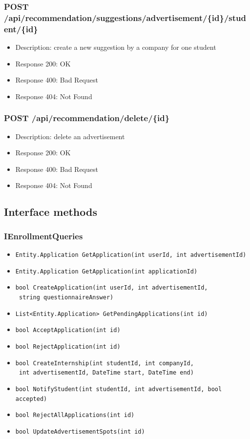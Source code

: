 \subsubsection{POST /api/recommendation/suggestions/advertisement/\{id\}/student/\{id\}}
\begin{itemize}
    \item Description: create a new suggestion by a company for one student
    \item Response 200: OK
    \item Response 400: Bad Request
    \item Response 404: Not Found
\end{itemize}

\subsubsection{POST /api/recommendation/delete/\{id\}}
\begin{itemize}
    \item Description: delete an advertisement
    \item Response 200: OK
    \item Response 400: Bad Request
    \item Response 404: Not Found
\end{itemize}

\subsection{Interface methods}

\subsubsection{IEnrollmentQueries}
\begin{itemize}
    \item \verb|Entity.Application GetApplication(int userId, int advertisementId)|
    \item \verb|Entity.Application GetApplication(int applicationId)|
    \item \verb|bool CreateApplication(int userId, int advertisementId,| \\ \makebox[10em][l]{} \verb| string questionnaireAnswer)|
    \item \verb|List<Entity.Application> GetPendingApplications(int id)|
    \item \verb|bool AcceptApplication(int id)|
    \item \verb|bool RejectApplication(int id)|
    \item \verb|bool CreateInternship(int studentId, int companyId,| \\ \makebox[10em][l]{} \verb| int advertisementId, DateTime start, DateTime end)|
    \item \verb|bool NotifyStudent(int studentId, int advertisementId, bool accepted)|
    \item \verb|bool RejectAllApplications(int id)|
    \item \verb|bool UpdateAdvertisementSpots(int id)|
\end{itemize}

